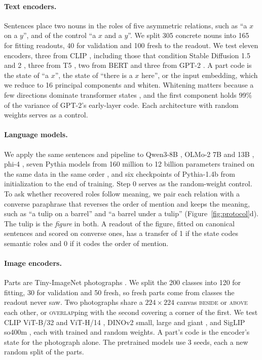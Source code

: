 \paragraph{Text encoders.} Sentences place two nouns in the roles of five asymmetric relations, such as ``a $x$ on a $y$'', and of the control ``a $x$ and a $y$''. We split 305 concrete nouns into 165 for fitting readouts, 40 for validation and 100 fresh to the readout. We test eleven encoders, three from CLIP \citep{radford2021clip}, including those that condition Stable Diffusion 1.5 and 2 \citep{rombach2022}, three from T5 \citep{raffel2020t5}, two from BERT \citep{devlin2019bert} and three from GPT-2 \citep{radford2019gpt2}. A part code is the state of ``a $x$'', the state of ``there is a $x$ here'', or the input embedding, which we reduce to 16 principal components and whiten. Whitening matters because a few directions dominate transformer states \citep{ethayarajh2019,timkey2021}, and the first component holds 99\% of the variance of GPT-2's early-layer code. Each architecture with random weights serves as a control.

\paragraph{Language models.} We apply the same sentences and pipeline to Qwen3-8B \citep{yang2025qwen3}, OLMo-2 7B and 13B \citep{olmo2024olmo2}, phi-4 \citep{abdin2024phi4}, seven Pythia models from 160 million to 12 billion parameters trained on the same data in the same order \citep{biderman2023pythia}, and six checkpoints of Pythia-1.4b from initialization to the end of training. Step 0 serves as the random-weight control. To ask whether recovered roles follow meaning, we pair each relation with a converse paraphrase that reverses the order of mention and keeps the meaning, such as ``a tulip on a barrel'' and ``a barrel under a tulip'' (Figure~\ref{fig:protocol}d). The tulip is the \emph{figure} in both. A readout of the figure, fitted on canonical sentences and scored on converse ones, has a transfer of 1 if the state codes semantic roles and 0 if it codes the order of mention.

\paragraph{Image encoders.} Parts are Tiny-ImageNet photographs \citep{le2015tiny}. We split the 200 classes into 120 for fitting, 30 for validation and 50 fresh, so fresh parts come from classes the readout never saw. Two photographs share a $224 \times 224$ canvas \textsc{beside} or \textsc{above} each other, or \textsc{overlap}ping with the second covering a corner of the first. We test CLIP ViT-B/32 and ViT-H/14 \citep{radford2021clip,cherti2023}, DINOv2 small, large and giant \citep{oquab2024dinov2}, and SigLIP so400m \citep{zhai2023siglip}, each with trained and random weights. A part's code is the encoder's state for the photograph alone. The pretrained models use 3 seeds, each a new random split of the parts.

